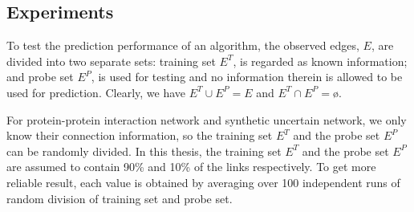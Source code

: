 \documentclass[\main/thesis.tex]{subfiles}
\begin{document}
\subsection{Experiments}
To test the prediction performance of an algorithm, the observed edges, $E$, are divided into two separate sets: training set $E^T$, is regarded as known information; and probe set $E^P$, is used for testing and no information therein is allowed to be used for prediction. Clearly, we have $E^T \cup E^P = E$ and $E^T \cap E^P = $\o. 

For protein-protein interaction network and synthetic uncertain network, we only know their connection information, so the training set $E^T$ and the probe set $E^P$ can be randomly divided. In this thesis, the training set $E^T$ and the probe set $E^P$ are assumed to contain 90\% and 10\% of the links respectively. To get more reliable result, each value is obtained by averaging over 100 independent runs of random division of training set and probe set.
\end{document}
